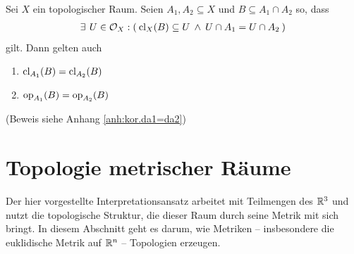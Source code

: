     \begin{kor}\label{kor:da1=da2} \ \vspace{8pt}

        \noindent
        Sei $X$ ein topologischer Raum. Seien $A_1, A_2 \subseteq X$ und $B \subseteq A_1 \cap A_2$ so, dass
        \begin{align*}
            \exists\: \, U \in \mathcal{O}_X: (\: \text{cl}_X(B) \subseteq U \:\land\: U \cap A_1 = U \cap A_2 \:)
        \end{align*}
        gilt. Dann gelten auch  
        \begin{enumerate}
            \item \label{kor:da1=da2.1} $\text{cl}_{A_1}(B) = \text{cl}_{A_2}(B)$
            \item \label{kor:da1=da2.2} $\text{op}_{A_1}(B) = \text{op}_{A_2}(B)$
        \end{enumerate} 
        (Beweis siehe Anhang \ref{anh:kor.da1=da2})
    \end{kor}
    
    
    
    
    
    


\section{Topologie metrischer Räume}\label{sec:top-metr-raeume}

    Der hier vorgestellte Interpretationsansatz arbeitet mit Teilmengen des $\mathbb{R}^3$ und nutzt die topologische Struktur, die dieser Raum durch seine Metrik mit sich bringt.
    In diesem Abschnitt geht es darum, wie Metriken -- insbesondere die euklidische Metrik auf $\mathbb{R}^n$ -- Topologien erzeugen.
    
